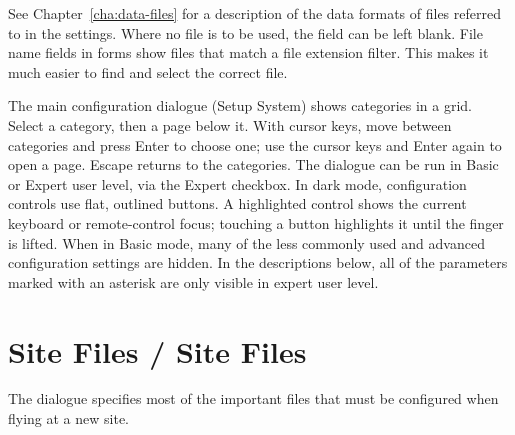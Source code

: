See Chapter~\ref{cha:data-files} for a description of the data formats
of files referred to in the settings.  Where no file is to be used,
the field can be left blank.  File name fields in forms show files
that match a file extension filter.  This makes it much easier to find
and select the correct file.

The main configuration dialogue (Setup System) shows categories in a
grid. Select a category, then a page below it. With cursor keys, move
between categories and press Enter to choose one; use the cursor keys
and Enter again to open a page. Escape returns to the categories.
The dialogue can be run in Basic or Expert user level, via the Expert
checkbox.
In dark mode, configuration controls use flat, outlined buttons.  A
highlighted control shows the current keyboard or remote-control focus;
touching a button highlights it until the finger is lifted.
When in Basic mode, many of the less commonly used and advanced
configuration settings are hidden.  In the descriptions below,
all of the parameters marked with an asterisk are only visible in
expert user level. 

\section{Site Files / Site Files}\label{sec:site-files}
The dialogue specifies most of the important files that must be
configured when flying at a new site.

